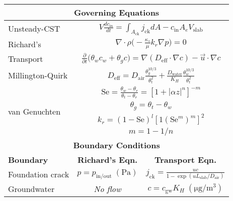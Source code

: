 \documentclass[preprint,12pt]{elsarticle}
\begin{document}
\begin{table}[htb!]
  \setlength{\tabcolsep}{1pt}
  \centering
  \begin{tabular}{l c c c c c c}
    \toprule
    \multicolumn{7}{c}{\textbf{Governing Equations}} \\
    \midrule
    Unsteady-CST & \multicolumn{6}{c}{$V\frac{d c_\mathrm{in}}{d t} = \int_{A_\mathrm{ck}} j_\mathrm{ck} dA - c_\mathrm{in} A_e V_\mathrm{slab}$} \\
    Richard's & \multicolumn{6}{c}{$\nabla \cdot \rho \Big( - \frac{\kappa_s}{\mu} k_r \nabla p \Big) = 0$} \\
    Transport & \multicolumn{6}{c}{$\frac{\partial}{\partial t} \Big( \theta_w c_w + \theta_g c \Big) = \nabla (D_\mathrm{eff} \cdot \nabla c) - \vec{u} \cdot \nabla c$} \\
    Millington-Quirk & \multicolumn{6}{c}{$D_\mathrm{eff} = D_\mathrm{air}\frac{\theta_g^{10/3}}{\theta_t^2} + \frac{D_\mathrm{water}}{K_H} \frac{\theta_w^{10/3}}{\theta_t^2}$} \\
    \multirow{4}{*}{van Genuchten} & \multicolumn{6}{c}{$\mathrm{Se} = \frac{\theta_w - \theta_r}{\theta_t - \theta_r} = [1 + |\alpha z|^n]^{-m}$} \\
     & \multicolumn{6}{c}{$\theta_g = \theta_t - \theta_w$}\\
     & \multicolumn{6}{c}{$k_r = (1-\mathrm{Se})^{l}[1(\mathrm{Se}^{m})^m]^2$} \\
     & \multicolumn{6}{c}{$m = 1 - 1/n$} \\
    \midrule
    \multicolumn{7}{c}{\textbf{Boundary Conditions}} \\
    \midrule
    \textbf{Boundary} & \multicolumn{3}{c}{\textbf{Richard's Eqn.}} & \multicolumn{3}{c}{\textbf{Transport Eqn.}} \\
    Foundation crack & \multicolumn{3}{c}{$p = p_\mathrm{in/out} \; \mathrm{(Pa)}$} & \multicolumn{3}{c}{$j_\mathrm{ck} = \frac{u c}{1 - \exp{(u L_\mathrm{slab}/D_\mathrm{air})}}$} \\
    Groundwater & \multicolumn{3}{c}{\textit{No flow}} & \multicolumn{3}{c}{$c = c_\mathrm{gw} K_H \; \mathrm{(\mu g/m^3)}$} \\

\end{tabular}
\end{table}
\end{document}
